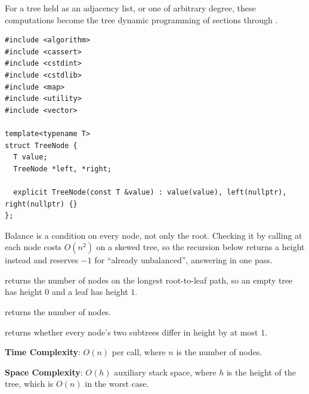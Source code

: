 For a tree held as an adjacency list, or one of arbitrary degree, these computations become the tree dynamic programming of sections  through .

\begin{lstlisting}[style=cpp]
#include <algorithm>
#include <cassert>
#include <cstdint>
#include <cstdlib>
#include <map>
#include <utility>
#include <vector>

template<typename T>
struct TreeNode {
  T value;
  TreeNode *left, *right;

  explicit TreeNode(const T &value) : value(value), left(nullptr), right(nullptr) {}
};
\end{lstlisting}
Balance is a condition on every node, not only the root. Checking it by calling  at each node costs $O(n^{2})$ on a skewed tree, so the recursion below returns a height instead and reserves $-1$ for ``already unbalanced'', answering in one pass.

\begin{compactitem}
  \item {} returns the number of nodes on the longest root-to-leaf path, so an empty tree has height $0$ and a leaf has height $1$.
  \item {} returns the number of nodes.
  \item {} returns whether every node's two subtrees differ in height by at most $1$.
\end{compactitem}

\textbf{Time Complexity}: $O(n)$ per call, where $n$ is the number of nodes.

\textbf{Space Complexity}: $O(h)$ auxiliary stack space, where $h$ is the height of the tree, which is $O(n)$ in the worst case.

